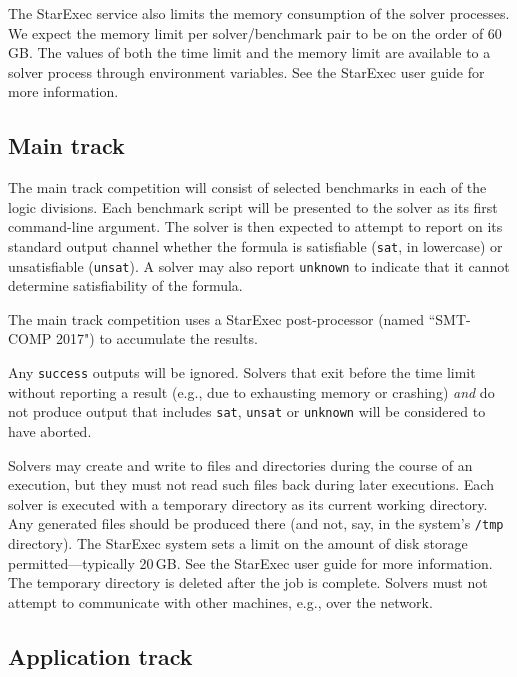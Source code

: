 \documentclass[12pt]{article}
\begin{document}
The StarExec service also limits the memory consumption of the solver
processes.  We expect the memory limit per solver/benchmark pair to be
on the order of 60\,GB.  The values of both the time limit and the
memory limit are available to a solver process through environment
variables.  See the StarExec user guide for more information.

\subsection{Main track}
\label{sec:exec:main}

The main track competition will consist of selected benchmarks in each
of the logic divisions.  Each benchmark script will be presented to
the solver as its first command-line argument.  The solver is then
expected to attempt to report on its standard output channel whether
the formula is satisfiable (\texttt{sat}, in lowercase) or
unsatisfiable (\texttt{unsat}).  A solver may also report
\texttt{unknown} to indicate that it cannot determine satisfiability
of the formula.

The main track competition uses a StarExec post-processor (named
``SMT-COMP 2017") to accumulate the results.

%
Any \texttt{success} outputs will be ignored.  Solvers that exit
before the time limit without reporting a result (e.g., due to
exhausting memory or crashing) \emph{and} do not produce output that
includes \texttt{sat}, \texttt{unsat} or \texttt{unknown} will be
considered to have aborted.

%
Solvers may create and write to files and directories during the
course of an execution, but they must not read such files back during
later executions.  Each solver is executed with a temporary directory
as its current working directory.  Any generated files should be
produced there (and not, say, in the system's \texttt{/tmp}
directory).  The StarExec system sets a limit on the amount of disk
storage permitted---typically 20\,GB.  See the StarExec user guide for
more information.  The temporary directory is deleted after the job is
complete.  Solvers must not attempt to communicate with other
machines, e.g., over the network.

\subsection{Application track}
\end{document}
